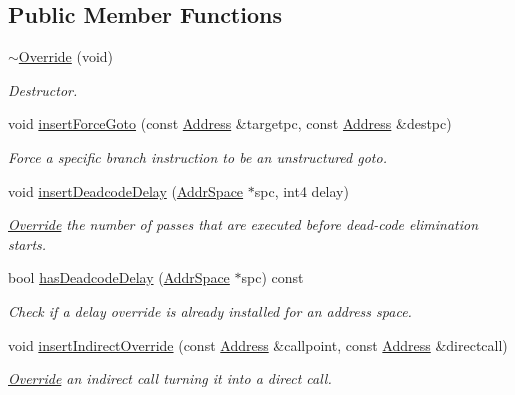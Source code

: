 \subsection*{Public Member Functions}
\begin{DoxyCompactItemize}
\item 
\mbox{\hyperlink{class_override_a0adca3a723f1dec1e81b955f56790a35}{$\sim$\+Override}} (void)
\begin{DoxyCompactList}\small\item\em Destructor. \end{DoxyCompactList}\item 
void \mbox{\hyperlink{class_override_a124d24114684c22e3f001c910763fae1}{insert\+Force\+Goto}} (const \mbox{\hyperlink{class_address}{Address}} \&targetpc, const \mbox{\hyperlink{class_address}{Address}} \&destpc)
\begin{DoxyCompactList}\small\item\em Force a specific branch instruction to be an unstructured {\itshape goto}. \end{DoxyCompactList}\item 
void \mbox{\hyperlink{class_override_a2e55dd5f8157f3f7660c863eb7d036f9}{insert\+Deadcode\+Delay}} (\mbox{\hyperlink{class_addr_space}{Addr\+Space}} $\ast$spc, int4 delay)
\begin{DoxyCompactList}\small\item\em \mbox{\hyperlink{class_override}{Override}} the number of passes that are executed before {\itshape dead-\/code} elimination starts. \end{DoxyCompactList}\item 
bool \mbox{\hyperlink{class_override_a3845c19e46f983d2034e06bb1980b672}{has\+Deadcode\+Delay}} (\mbox{\hyperlink{class_addr_space}{Addr\+Space}} $\ast$spc) const
\begin{DoxyCompactList}\small\item\em Check if a delay override is already installed for an address space. \end{DoxyCompactList}\item 
void \mbox{\hyperlink{class_override_a244525d6ba415aab3769255c79ab7ba8}{insert\+Indirect\+Override}} (const \mbox{\hyperlink{class_address}{Address}} \&callpoint, const \mbox{\hyperlink{class_address}{Address}} \&directcall)
\begin{DoxyCompactList}\small\item\em \mbox{\hyperlink{class_override}{Override}} an indirect call turning it into a direct call. \end{DoxyCompactList}\item 

\end{DoxyCompactItemize}
